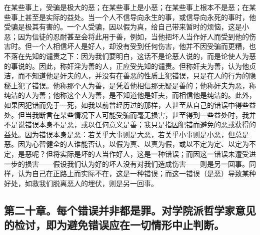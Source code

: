在某些事上，受骗是极大的恶；在某些事上是小恶；在某些事上根本不是恶；在某些事上甚至是实际的益处。当一个人不信导向永生的事，或信导向永死的事时，他受骗是极其有害的。一个人受骗，因以假为真，给自己带来暂时的烦恼，这是小恶；因为信徒的忍耐甚至会将此用于善，例如，当他把坏人当作好人而受到他的伤害时。但一个人相信坏人是好人，却没有受到任何伤害，他并不因受骗而更糟，也不落在先知的谴责之下：因为我们要明白，这话不是论恶人说的，而是论使人为恶的事说的。因此，称奸淫为善的人，正应受先知的谴责。但称奸夫为善，认为他贞洁，而不知道他是奸夫的人，并没有在善恶的性质上犯错误，只是在人的行为的隐秘上犯了错误。他称那个人为善，是凭着他相信那无疑是善的；他称奸夫为恶，称纯洁的人为善；他称这个人为善，是不知道他是奸夫，而相信他是纯洁的。此外，如果因犯错而免于一死，如我以前曾经历过的那样，人甚至从自己的错误中得些益处。但当我断言在某些情况下人可能受骗而毫无损害，甚至得到一些益处时，我并不是说错误本身不是恶，或以任何意义是善；我只是指因犯错而避免的恶或获得的益处。因为错误本身是恶：若关乎大事则是大恶，若关乎小事则是小恶，但总是恶。因为心智健全的人谁能否认，以假为真、以真为假，或以不定为定、以定为不定，是恶呢？但将实际是坏的人当作好人，这是一种错误；而因这一错误未遭受进一步的损害——假设我们认为好的坏人没有对我们造成伤害——则是另一回事。同样，认为自己在正路上而实际不在，这是一种错误；而这一错误（是恶）导致某种好处，如救我们脱离恶人的埋伏，则是另一回事。\par


\subsection{第二十章。每个错误并非都是罪。对学院派哲学家意见的检讨，即为避免错误应在一切情形中止判断。}

